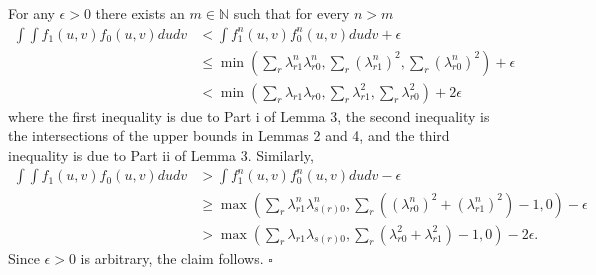 \documentclass[12pt]{article}
\theoremstyle{definition}
\begin{document}
For any $\epsilon > 0$ there exists an $m \in \mathbb{N}$ such that for every $n > m$
\begin{align*}
 \int\int f_{1}(u,v)f_{0}(u,v)dudv
 &< \int f_{1}^{n}(u,v)f_{0}^{n}(u,v)dudv + \epsilon \\
 &\leq  \min\left(\sum_{r}\lambda^{n}_{r1}\lambda^{n}_{r0},\sum_{r}(\lambda^{n}_{r1})^{2},\sum_{r}(\lambda^{n}_{r0})^{2}\right) + \epsilon  \\
& < \min\left(\sum_{r}\lambda_{r1}\lambda_{r0},\sum_{r}\lambda^{2}_{r1},\sum_{r}\lambda^{2}_{r0}\right) + 2\epsilon
\end{align*}
where the first inequality is due to Part i of Lemma 3, the second inequality is the intersections of the upper bounds in Lemmas 2 and 4, and the third inequality is due to Part ii of Lemma 3. Similarly, 
\begin{align*}
 \int\int f_{1}(u,v)f_{0}(u,v)dudv
 &> \int f_{1}^{n}(u,v)f_{0}^{n}(u,v)dudv - \epsilon \\
 &\geq \max\left(\sum_{r}\lambda^{n}_{r1}\lambda^{n}_{s(r)0},\sum_{r }\left((\lambda_{r0}^{n})^{2}+(\lambda_{r1}^{n})^{2}\right) - 1,0\right) - \epsilon \\
 &> \max\left(\sum_{r}\lambda_{r1}\lambda_{s(r)0},\sum_{r}\left(\lambda_{r0}^{2}+\lambda_{r1}^{2}\right) - 1,0\right) - 2\epsilon.
\end{align*}
Since $\epsilon > 0$ is arbitrary, the claim follows. $\square$
\end{document}
